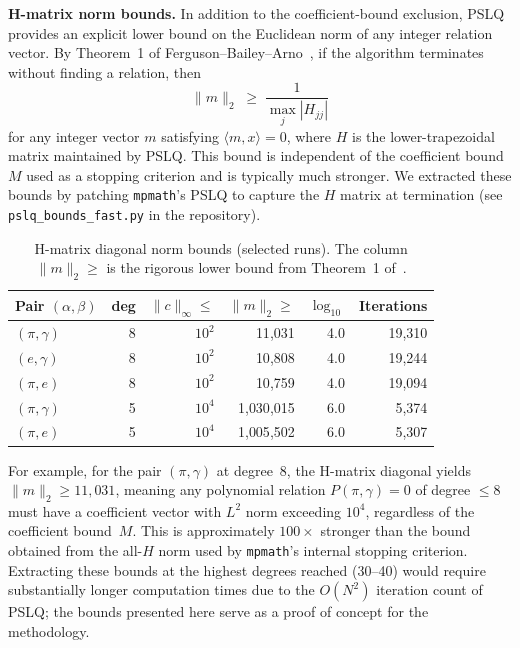 \documentclass[11pt]{amsart}
\theoremstyle{remark}
\newcommand{\norm}[1]{\lVert #1 \rVert}
\begin{document}
\medskip\noindent\textbf{H-matrix norm bounds.}
In addition to the coefficient-bound exclusion, PSLQ provides an explicit lower
bound on the Euclidean norm of any integer relation vector. By Theorem~1 of
Ferguson--Bailey--Arno~\cite{FergusonBaileyArno1999}, if the algorithm terminates
without finding a relation, then
\[
  \norm{m}_2 \;\geq\; \frac{1}{\max_j |H_{jj}|}
\]
for any integer vector $m$ satisfying $\langle m, x\rangle = 0$, where $H$ is the
lower-trapezoidal matrix maintained by PSLQ. This bound is independent of the
coefficient bound $M$ used as a stopping criterion and is typically much stronger.
We extracted these bounds by patching \texttt{mpmath}'s PSLQ to capture the $H$
matrix at termination (see \texttt{pslq\_bounds\_fast.py} in the repository).

\begin{table}[ht]
\centering
\caption{H-matrix diagonal norm bounds (selected runs). The column
$\norm{m}_2\!\ge$ is the rigorous lower bound from Theorem~1
of~\cite{FergusonBaileyArno1999}.}\label{tab:hbounds}
\smallskip
\begin{tabular}{@{}l rr r r r@{}}
\toprule
Pair $(\alpha,\beta)$ & deg & $\norm{c}_\infty\!\le$ & $\norm{m}_2\!\ge$ & $\log_{10}$ & Iterations \\
\midrule
$(\pi,\gamma)$ & 8 & $10^2$ & 11{,}031 & 4.0 & 19{,}310 \\
$(e,\gamma)$   & 8 & $10^2$ & 10{,}808 & 4.0 & 19{,}244 \\
$(\pi,e)$      & 8 & $10^2$ & 10{,}759 & 4.0 & 19{,}094 \\
$(\pi,\gamma)$ & 5 & $10^4$ & 1{,}030{,}015 & 6.0 & 5{,}374 \\
$(\pi,e)$      & 5 & $10^4$ & 1{,}005{,}502 & 6.0 & 5{,}307 \\
\bottomrule
\end{tabular}
\end{table}

\noindent For example, for the pair $(\pi,\gamma)$ at degree~8, the H-matrix diagonal
yields $\norm{m}_2 \ge 11{,}031$, meaning any polynomial relation
$P(\pi,\gamma)=0$ of degree $\le 8$ must have a coefficient vector with $L^2$
norm exceeding $10^4$, regardless of the coefficient bound~$M$. This is
approximately $100\times$ stronger than the bound obtained from the all-$H$ norm
used by \texttt{mpmath}'s internal stopping criterion. Extracting these bounds at
the highest degrees reached (30--40) would require substantially longer computation
times due to the $O(N^2)$ iteration count of PSLQ; the bounds presented here serve
as a proof of concept for the methodology.
\end{document}
